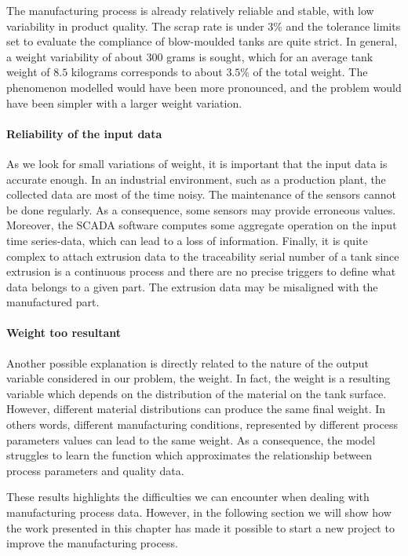 The manufacturing process is already relatively reliable and stable, with low variability in product quality. The scrap rate is under 3\% and the tolerance limits set to evaluate the compliance of blow-moulded tanks are quite strict. In general, a weight variability of about 300 grams is sought, which for an average tank weight of $8.5$ kilograms corresponds to about $3.5\%$ of the total weight. The phenomenon modelled would have been more pronounced, and the problem would have been simpler with a larger weight variation.     

\paragraph{Reliability of the input data}

As we look for small variations of weight, it is important that the input data is accurate enough. In an industrial environment, such as a production plant, the collected data are most of the time noisy. The maintenance of the sensors cannot be done regularly. As a consequence, some sensors may provide erroneous values. Moreover, the SCADA software computes some aggregate operation on the input time series-data, which can lead to a loss of information. Finally, it is quite complex to attach extrusion data to the traceability serial number of a tank since extrusion is a continuous process and there are no precise triggers to define what data belongs to a given part. The extrusion data may be misaligned with the manufactured part.  

\paragraph{Weight too resultant}

Another possible explanation is directly related to the nature of the output variable considered in our problem, the weight. In fact, the weight is a resulting variable which depends on the distribution of the material on the tank surface. However, different material distributions can produce the same final weight. In others words, different manufacturing conditions, represented by different process parameters values can lead to the same weight. As a consequence, the model struggles to learn the function which approximates the relationship between process parameters and quality data.

These results highlights the difficulties we can encounter when dealing with manufacturing process data. However, in the following section we will show how the work presented in this chapter has made it possible to start a new project to improve the manufacturing process. 


